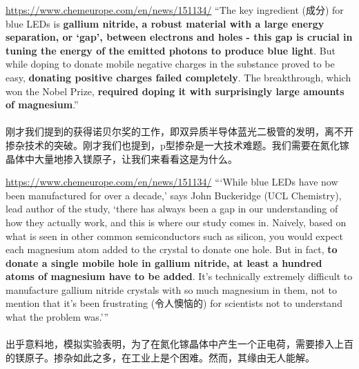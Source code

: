 
\begin{slide}{\url{https://www.chemeurope.com/en/news/151134/}}
  ``The key ingredient (成分) for blue LEDs is \textbf{gallium nitride, a robust material with a large energy separation, or `gap', between electrons and holes - this gap is crucial in tuning the energy of the emitted photons to produce blue light}. But while doping to donate mobile negative charges in the substance proved to be easy, \textbf{donating positive charges failed completely}. The breakthrough, which won the Nobel Prize, \textbf{required doping it with surprisingly large amounts of magnesium}.''
  \\~\\
  刚才我们提到的获得诺贝尔奖的工作，即双异质半导体蓝光二极管的发明，离不开掺杂技术的突破。刚才我们也提到，p型掺杂是一大技术难题。我们需要在氮化镓晶体中大量地掺入镁原子，让我们来看看这是为什么。
\end{slide}

\begin{slide}{\url{https://www.chemeurope.com/en/news/151134/}}
  {\small ```While blue LEDs have now been manufactured for over a decade,' says John Buckeridge (UCL Chemistry), lead author of the study, `there has always been a gap in our understanding of how they actually work, and this is where our study comes in. Naively, based on what is seen in other common semiconductors such as silicon, you would expect each magnesium atom added to the crystal to donate one hole. But in fact, \textbf{to donate a single mobile hole in gallium nitride, at least a hundred atoms of magnesium have to be added}. It's technically extremely difficult to manufacture gallium nitride crystals with so much magnesium in them, not to mention that it's been frustrating (令人懊恼的) for scientists not to understand what the problem was.'{''}}
  \\~\\
  出乎意料地，模拟实验表明，为了在氮化镓晶体中产生一个正电荷，需要掺入上百的镁原子。掺杂如此之多，在工业上是个困难。然而，其缘由无人能解。
\end{slide}

